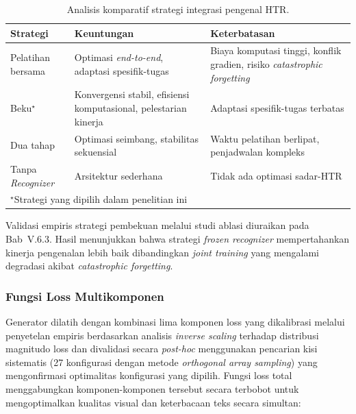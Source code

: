 \documentclass[12pt,a4paper]{article}
\begin{document}
\begin{table}[H]
  \caption[Analisis komparatif strategi integrasi pengenal HTR]{Analisis komparatif strategi integrasi pengenal HTR.}
  \label{table:recognizer_strategy_comparison}
  \small
  \renewcommand{\arraystretch}{1.2}

  \begin{tabular}{|p{2.2cm}|p{5.2cm}|p{5.2cm}|}
    \hline
    \textbf{Strategi}           & \textbf{Keuntungan}                                              & \textbf{Keterbatasan}                                                     \\
    \hline
    Pelatihan bersama           & Optimasi \textit{end-to-end}, adaptasi spesifik-tugas            & Biaya komputasi tinggi, konflik gradien, risiko \textit{catastrophic forgetting} \\
    \hline
    Beku$^\star$                & Konvergensi stabil, efisiensi komputasional, pelestarian kinerja & Adaptasi spesifik-tugas terbatas                                      \\
    \hline
    Dua tahap                   & Optimasi seimbang, stabilitas sekuensial                         & Waktu pelatihan berlipat, penjadwalan kompleks                        \\
    \hline
    Tanpa \textit{Recognizer}   & Arsitektur sederhana                                             & Tidak ada optimasi sadar-HTR                                          \\
    \hline
    \multicolumn{3}{|l|}{\footnotesize $^\star$Strategi yang dipilih dalam penelitian ini}                                                              \\
    \hline
  \end{tabular}
\end{table}

Validasi empiris strategi pembekuan melalui studi ablasi diuraikan pada Bab~V.6.3. Hasil menunjukkan bahwa strategi \textit{frozen recognizer} mempertahankan kinerja pengenalan lebih baik dibandingkan \textit{joint training} yang mengalami degradasi akibat \textit{catastrophic forgetting}.


\subsubsection{Fungsi Loss Multikomponen}
\label{subsubsec:fungsi-loss-multikomponen}

Generator dilatih dengan kombinasi lima komponen loss yang dikalibrasi melalui penyetelan empiris berdasarkan analisis \textit{inverse scaling} terhadap distribusi magnitudo loss dan divalidasi secara \textit{post-hoc} menggunakan pencarian kisi sistematis (27 konfigurasi dengan metode \textit{orthogonal array sampling}) yang mengonfirmasi optimalitas konfigurasi yang dipilih. Fungsi loss total menggabungkan komponen-komponen tersebut secara terbobot untuk mengoptimalkan kualitas visual dan keterbacaan teks secara simultan:
\end{document}
